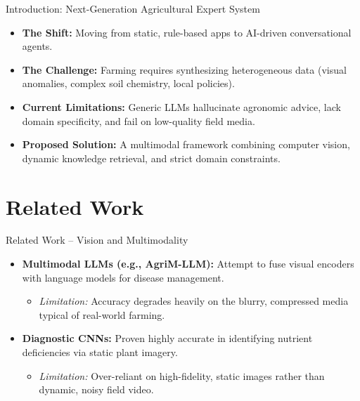 \documentclass{beamer}
\begin{document}
\begin{frame}{Introduction: Next-Generation Agricultural Expert System}
	\footnotesize
	\begin{itemize}
		\item \textbf{The Shift:} Moving from static, rule-based apps to AI-driven conversational agents.
		
		\vspace{0.2cm}
		\item \textbf{The Challenge:} Farming requires synthesizing heterogeneous data (visual anomalies, complex soil chemistry, local policies).
		
		\vspace{0.2cm}
		\item \textbf{Current Limitations:} Generic LLMs hallucinate agronomic advice, lack domain specificity, and fail on low-quality field media.
		
		\vspace{0.2cm}
		\item \textbf{Proposed Solution:} A multimodal framework combining computer vision, dynamic knowledge retrieval, and strict domain constraints.
	\end{itemize}
\end{frame}


\section{Related Work}
\begin{frame}{Related Work -- Vision and Multimodality}
	\footnotesize
	\begin{itemize}
		\item \textbf{Multimodal LLMs (e.g., AgriM-LLM):} Attempt to fuse visual encoders with language models for disease management.
		\begin{itemize}
			\item \textit{Limitation:} Accuracy degrades heavily on the blurry, compressed media typical of real-world farming.
		\end{itemize}
		
		\vspace{0.2cm}
		\item \textbf{Diagnostic CNNs:} Proven highly accurate in identifying nutrient deficiencies via static plant imagery.
		\begin{itemize}
			\item \textit{Limitation:} Over-reliant on high-fidelity, static images rather than dynamic, noisy field video.
		\end{itemize}
	\end{itemize}
\end{frame}
\end{document}
